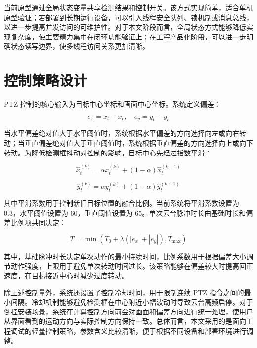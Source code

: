 当前原型通过全局状态变量共享检测结果和控制开关。该方式实现简单，适合单机原型验证；若部署到长期运行设备，可以引入线程安全队列、锁机制或消息总线，以进一步提高并发访问的可维护性。对于本文阶段而言，全局状态方式能够降低实现复杂度，使主要精力集中在闭环功能验证上；在工程产品化阶段，可以进一步明确状态读写边界，使多线程访问关系更加清晰。

\section{控制策略设计}

PTZ 控制的核心输入为目标中心坐标和画面中心坐标。系统定义偏差：

\begin{equation}
    e_x = x_t - x_c,\quad e_y = y_t - y_c
\end{equation}

当水平偏差绝对值大于水平阈值时，系统根据水平偏差的方向选择向左或向右转动；当垂直偏差绝对值大于垂直阈值时，系统根据垂直偏差的方向选择向上或向下转动。为降低检测框抖动对控制的影响，目标中心先经过指数平滑：

\begin{equation}
    \hat{x}_t^{(k)} = \alpha x_t^{(k)} + (1-\alpha)\hat{x}_t^{(k-1)}
\end{equation}

\begin{equation}
    \hat{y}_t^{(k)} = \alpha y_t^{(k)} + (1-\alpha)\hat{y}_t^{(k-1)}
\end{equation}

其中平滑系数用于控制新旧目标位置的融合比例。当前系统将平滑系数设置为 0.3，水平阈值设置为 60，垂直阈值设置为 65。单次云台脉冲时长由基础时长和偏差比例项共同决定：

\begin{equation}
    T = \min(T_0 + \lambda(|e_x|+|e_y|), T_{\max})
\end{equation}

其中，基础脉冲时长决定单次动作的最小持续时间，比例系数用于根据偏差大小调节动作强度，上限用于避免单次转动时间过长。该策略能够在偏差较大时提高回正速度，在目标接近中心时减少过度转动。

除上述控制量外，系统还设置了控制冷却时间，用于限制连续 PTZ 指令之间的最小间隔。冷却机制能够避免检测框在中心附近小幅波动时导致云台高频启停。对于倒挂安装场景，系统在计算控制方向前会对画面和偏差方向进行统一处理，使用户从界面看到的运动方向与实际控制方向保持一致。总体而言，本文采用的是面向工程调试的轻量控制策略，参数含义比较清晰，便于根据不同设备和部署环境进行调整。

